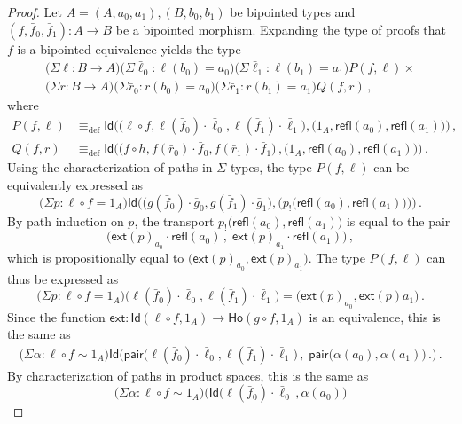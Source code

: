 \documentclass[reqno,10pt,a4paper,oneside]{amsart}
\numberwithin{equation}{section}
\theoremstyle{mythm}
\theoremstyle{mydef}
\theoremstyle{myrmk}
\newcommand{\deq}{\equiv}
\newcommand{\defeq}{\deq_{\mathrm{def}}}
\newcommand{\co}{\colon}
\newcommand{\comp}{\circ}
\newcommand{\ext}{\mathsf{ext}}
\newcommand{\ct}{\cdot}
\newcommand{\pair}{\mathsf{pair}}
\newcommand{\Id}{\mathsf{Id}}
\newcommand{\refl}{\mathsf{refl}}
\begin{document}
\begin{proof}
Let $A = (A,a_0,a_1), (B,b_0,b_1)$ be bipointed types and $(f, \bar{f}_0, \bar{f}_1) \co A \to B$ be a bipointed morphism. Expanding the type of 
proofs that $f$ is a bipointed equivalence yields the type
\begin{multline*}
 \big(\Sigma \ell \co B \to  A \big) \big(\Sigma \bar{\ell}_0 : \ell(b_0)=a_0 \big) \big(\Sigma \bar{\ell}_1 : \ell(b_1)=a_1\big) P(f,\ell) \times \\ 
 \big(\Sigma r \co B \to A \big) \big(\Sigma \bar{r}_0 : r(b_0)=a_0 \big) \big(\Sigma \bar{r}_1 : r(b_1)=a_1\big) Q(f, r)  \, , 
\end{multline*}
where
\begin{align*}
P(f,\ell) & \defeq \Id \Big( \big( \ell \comp f, \ell(\bar{f}_0) \ct \bar{\ell}_0, \ell(\bar{f}_1) \ct \bar{\ell}_1\big), \big( 1_A, \refl(a_0), \refl(a_1) \big) \Big)  \, , \\
Q(f,r)    & \defeq \Id \Big( \big( f \comp h,   f(\bar{r}_0) \ct \bar{f}_0, f(\bar{r}_1) \ct \bar{f}_1  \big) \, , \big( 1_A, \refl(a_0), \refl(a_1) \big) \Big) \, .
\end{align*}
Using the characterization of paths in $\Sigma$-types, the type $P(f,\ell)$ can be equivalently expressed as
\[
\big(\Sigma p : \ell \comp f = 1_A \big)  \Id \Big(  \big( g(\bar{f}_0) \ct \bar{g}_0, g(\bar{f}_1) \ct \bar{g}_1\big), \big( p_{!}\big(\refl(a_0), \refl(a_1) \big) \big) \Big) \, .
\]
By path induction on $p$, the transport $p_{!}\big(\refl(a_0), \refl(a_1) \big)$ is equal to the pair 
\[
\big(  \ext(p)_{a_0} \ct \refl(a_0) \, , \;  \ext(p)_{a_1} \ct \refl(a_1) \big) \, ,
\]
which is propositionally equal to $\big(\ext(p)_{a_0}, \ext(p)_{a_1} \big)$. The type $P(f,\ell)$ can thus be expressed as
\[
\big(\Sigma p : \ell \comp f = 1_A \big) \big(\ell (\bar{f}_0) \ct \bar{\ell}_0, \ell(\bar{f}_1) \ct \bar{\ell}_1\big)
 = 
\big(\ext(p)_{a_0}, \ext(p){a_1} \big) \, .
\]
Since the function $\ext : \Id(\ell \comp f, 1_A) \to \mathsf{Ho}(g \comp f,  1_A)$ is an equivalence, this is the same as
\begin{align*}
\big(\Sigma \alpha : \ell \comp f \sim 1_A \big) 
\Id 
\Big( 
\pair \big( \ell(\bar{f}_0) \ct \bar{\ell}_0, \ell(\bar{f}_1) \ct \bar{\ell}_1\big) \, , \; 
\pair \big(  \alpha(a_0), \alpha(a_1)  \big) \, .
\Big) \, .
\end{align*}
By characterization of paths in product spaces, this is the same as
\[
\big(\Sigma \alpha : \ell \comp f \sim 1_A \big) 
\Big(
\Id  \big( \ell (\bar{f}_0) \ct \bar{\ell}_0 \, ,  \alpha(a_0) \big) 
\]
\end{proof}
\end{document}
